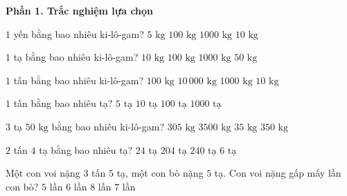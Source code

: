 \textbf{Phần 1. Trắc nghiệm lựa chọn}

\begin{ex} %
$1$ yến bằng bao nhiêu ki-lô-gam?
\choice
{$5\text{ kg}$}
{$100\text{ kg}$}
{$1000\text{ kg}$}
{\True $10\text{ kg}$}
\end{ex}

\begin{ex} %
$1$ tạ bằng bao nhiêu ki-lô-gam?
\choice
{$10\text{ kg}$}
{\True $100\text{ kg}$}
{$1000\text{ kg}$}
{$50\text{ kg}$}
\end{ex}

\begin{ex} %
$1$ tấn bằng bao nhiêu ki-lô-gam?
\choice
{$100\text{ kg}$}
{$10\,000\text{ kg}$}
{\True $1000\text{ kg}$}
{$10\text{ kg}$}
\end{ex}

\begin{ex} %
$1$ tấn bằng bao nhiêu tạ?
\choice
{$5\text{ tạ}$}
{\True $10\text{ tạ}$}
{$100\text{ tạ}$}
{$1000\text{ tạ}$}
\end{ex}

\begin{ex} %
$3$ tạ $50\text{ kg}$ bằng bao nhiêu ki-lô-gam?
\choice
{$305\text{ kg}$}
{$3500\text{ kg}$}
{$35\text{ kg}$}
{\True $350\text{ kg}$}
\end{ex}

\begin{ex} %
$2$ tấn $4$ tạ bằng bao nhiêu tạ?
\choice
{\True $24\text{ tạ}$}
{$204\text{ tạ}$}
{$240\text{ tạ}$}
{$6\text{ tạ}$}
\end{ex}

\begin{ex} %
Một con voi nặng $3$ tấn $5$ tạ, một con bò nặng $5$ tạ. Con voi nặng gấp mấy lần con bò?
\choice
{$5$ lần}
{$6$ lần}
{$8$ lần}
{\True $7$ lần}
\end{ex}

